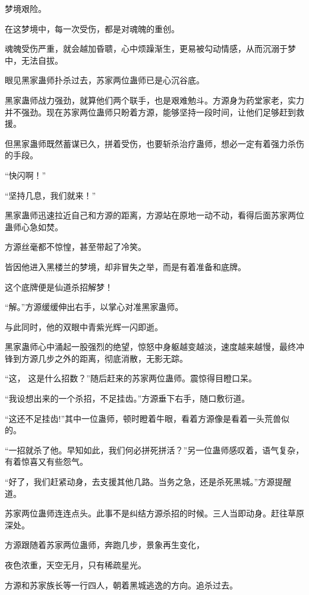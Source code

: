 
\begin{this_body}

梦境艰险。

在这梦境中，每一次受伤，都是对魂魄的重创。

魂魄受伤严重，就会越加昏聩，心中烦躁渐生，更易被勾动情感，从而沉溺于梦中，无法自拔。

眼见黑家蛊师扑杀过去，苏家两位蛊师已是心沉谷底。

黑家蛊师战力强劲，就算他们两个联手，也是艰难勉斗。方源身为药堂家老，实力并不强劲。现在苏家两位蛊师只盼着方源，能够坚持一段时间，让他们足够赶到救援。

但黑家蛊师既然蓄谋已久，拼着受伤，也要斩杀治疗蛊师，想必一定有着强力杀伤的手段。

“快闪啊！”

“坚持几息，我们就来！”

黑家蛊师迅速拉近自己和方源的距离，方源站在原地一动不动，看得后面苏家两位蛊师心急如焚。

方源丝毫都不惊惶，甚至带起了冷笑。

皆因他进入黑楼兰的梦境，却非冒失之举，而是有着准备和底牌。

这个底牌便是仙道杀招解梦！

“解。”方源缓缓伸出右手，以掌心对准黑家蛊师。

与此同时，他的双眼中青紫光辉一闪即逝。

黑家蛊师心中涌起一股强烈的绝望，惊怒中身躯越变越淡，速度越来越慢，最终冲锋到方源几步之外的距离，彻底消散，无影无踪。

“这， 这是什么招数？”随后赶来的苏家两位蛊师。震惊得目瞪口呆。

“我设想出来的一个杀招，不足挂齿。”方源垂下右手，随口敷衍道。

“这还不足挂齿!”其中一位蛊师，顿时瞪着牛眼，看着方源像是看着一头荒兽似的。

“一招就杀了他。早知如此，我们何必拼死拼活？”另一位蛊师感叹着，语气复杂，有着惊喜又有些怨气。

“好了，我们赶紧动身，去支援其他几路。当务之急，还是杀死黑城。”方源提醒道。

苏家两位蛊师连连点头。此事不是纠结方源杀招的时候。三人当即动身。赶往草原深处。

方源跟随着苏家两位蛊师，奔跑几步，景象再生变化，

夜色浓重，天空无月，只有稀疏星光。

方源和苏家族长等一行四人，朝着黑城逃逸的方向。追杀过去。


\end{this_body}

